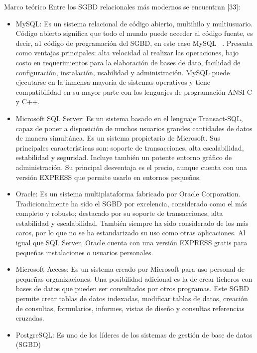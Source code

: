 \begin{thesischapter}{1} {Marco teórico}
    \vspace{10pt}
    Entre los SGBD relacionales más modernos se encuentran [33]:
    \begin{itemize}
        \item MySQL: Es un sistema relacional de código abierto, multihilo y multiusuario. Código
        abierto significa que todo el mundo puede acceder al código fuente, es decir, a1 código de
        programación del SGBD, en este caso MySQL ~\cite{ian2003biblia}. Presenta como ventajas principales: alta
        velocidad al realizar las operaciones, bajo costo en requerimientos para la elaboración de
        bases de dato, facilidad de configuración, instalación, usabilidad y administración. MySQL
        puede ejecutarse en la inmensa mayoría de sistemas operativos y tiene compatibilidad en su
        mayor parte con los lenguajes de programación ANSI C y C++.
        \item Microsoft SQL Server: Es un sistema basado en el lenguaje Transact-SQL, capaz de poner
        a disposición de muchos usuarios grandes cantidades de datos de manera simultánea. Es un
        sistema propietario de Microsoft. Sus principales características son: soporte de
        transacciones, alta escalabilidad, estabilidad y seguridad. Incluye también un potente entorno
        gráfico de administración. Su principal desventaja es el precio, aunque cuenta con una
        versión EXPRESS que permite usarlo en entornos pequeños.
        \item Oracle: Es un sistema multiplataforma fabricado por Oracle Corporation. Tradicionalmente
        ha sido el SGBD por excelencia, considerado como el más completo y robusto; destacado
        por su soporte de transacciones, alta estabilidad y escalabilidad. También siempre ha sido
        considerado de los más caros, por lo que no se ha estandarizado su uso como otras
        aplicaciones. Al igual que SQL Server, Oracle cuenta con una versión EXPRESS gratis para
        pequeñas instalaciones o usuarios personales.
        \item Microsoft Access: Es un sistema creado por Microsoft para uso personal de pequeñas
        organizaciones. Una posibilidad adicional es la de crear ficheros con bases de datos que
        pueden ser consultados por otros programas. Este SGBD permite crear tablas de datos
        indexadas, modificar tablas de datos, creación de consultas, formularios, informes, vistas de
        diseño y consultas referencias cruzadas.
        \item PostgreSQL: Es uno de los líderes de los sistemas de gestión de base de datos (SGBD)

\end{itemize}
\end{thesischapter}
